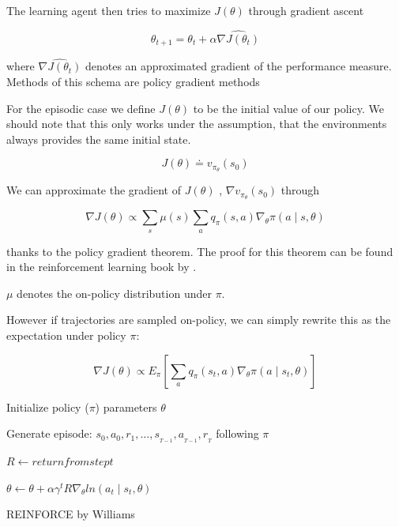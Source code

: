 The learning agent then tries to maximize $J(\theta)$ through gradient ascent

\begin{equation}
\theta_{t+1} = \theta_t + \alpha \widehat{\nabla J(\theta_t)}
\end{equation}

where $\widehat{\nabla J(\theta_t)}$ denotes an approximated gradient of the performance measure.
Methods of this schema are policy gradient methods \citep{Sut98} 

For the episodic case we define $J(\theta)$ to be the initial value of our policy. We should note that this only works under the assumption, that the environments always provides the same initial state.

\begin{equation}
J(\theta) \doteq v_{\pi_\theta}(s_0)
\end{equation}

We can approximate the gradient of $J(\theta)$ , $ \nabla v_{\pi_\theta}(s_0)$ through

\begin{equation}
\nabla J(\theta) \propto \sum_s \mu (s) \sum_a q_\pi (s,a) \nabla_\theta \pi(a \mid s, \theta)
\end{equation}

thanks to the policy gradient theorem. The proof for this theorem can be found in the reinforcement learning book by \citet{Sut98}.

$\mu$ denotes the on-policy distribution under $\pi$.

However if trajectories are sampled on-policy, we can simply rewrite this as the expectation under policy $\pi$:

\begin{equation}
\nabla J(\theta) \propto E_\pi \left[ \sum_a q_\pi (s_t,a) \nabla_\theta \pi (a \mid s_t, \theta) \right]
\end{equation}


\begin{algorithm}[h]

 Initialize policy ($\pi$) parameters $\theta$ 
 
 { 
 Generate episode: $s_0, a_0, r_1, \dots,s_{_{T-1}},   a_{_{T-1}}, r_{_T}$ following $\pi$ 
 
 {
 $R \gets return from step t$
 
 $\theta \gets \theta + \alpha \gamma^t R\nabla_\theta ln(a_t \mid s_t, \theta)$
 }

 }

 \caption{REINFORCE by Williams \citep{Sut98}}
\end{algorithm}



